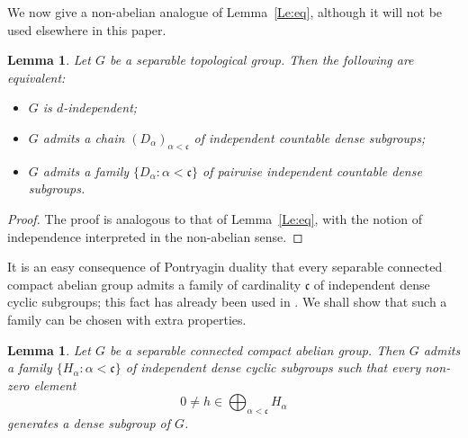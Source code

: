\documentclass[12pt]{amsart}
\newtheorem{lemma}[theorem]{Lemma}
\theoremstyle{definition}
\theoremstyle{remark}
\def\c {{\mathfrak{c}}}
\begin{document}
We now give a non-abelian analogue of Lemma~\ref{Le:eq}, although it will not be used elsewhere in this paper.



\begin{lemma}\label{Le:eq2}
Let $G$ be a separable topological group. Then the following are equivalent:
\begin{itemize}
\item[(1)] $G$ is $d$-independent;
\item[(2)] $G$ admits a chain $(D_\alpha)_{\alpha<\c}$ of independent countable dense subgroups;
\item[(3)] $G$ admits a family $\{D_\alpha:\alpha<\mathfrak c\}$ of pairwise independent countable dense subgroups.
\end{itemize}
\end{lemma}


\begin{proof}
The proof is analogous to that of Lemma~\ref{Le:eq}, with the notion of
independence interpreted in the non-abelian sense.
\end{proof}

It is an easy consequence of Pontryagin duality that every separable connected compact
abelian group admits a family of cardinality $\mathfrak{c}$ of independent dense cyclic
subgroups; this fact has already been used in \cite{MT}.
We shall show that such a family can be chosen with extra properties.

\begin{lemma}\label{Le:con}
Let $G$ be a separable connected compact abelian group.
Then $G$ admits a family $\{H_\alpha : \alpha<\mathfrak{c}\}$ of independent dense cyclic
subgroups such that every non-zero element
\[
0 \neq h \in \bigoplus_{\alpha<\mathfrak{c}} H_\alpha
\]
generates a dense subgroup of $G$.
\end{lemma}
\end{document}
